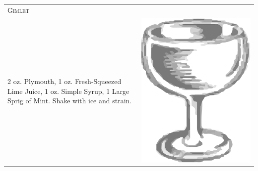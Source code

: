 \documentclass{article}
\begin{document}
\begin{tabular}{p{2in} p{0.5in}}
\multicolumn{2}{p{3in}}{\centering\Huge\textsc{Gimlet}} \\ 
   \vspace{-0.1in}2 oz. Plymouth, 1 oz. Fresh-Squeezed Lime Juice, 1 oz. Simple Syrup, 1 Large Sprig of Mint. Shake with ice and strain. &
   \vspace{-0.1in} \includegraphics{coupe.png}
\end{tabular}
\end{document}
